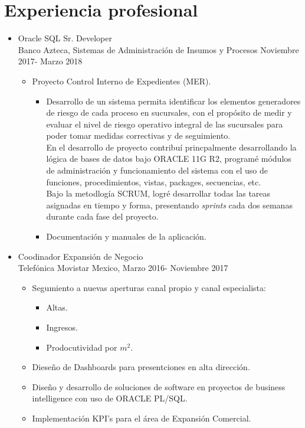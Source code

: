 \documentclass[21pt, onecolumn]{article} %
\begin{document}
\section*{ Experiencia profesional }

\begin{itemize}
 \item Oracle SQL Sr. Developer\\
  Banco Azteca, Sistemas de Administración de Insumos y Procesos {Noviembre 2017- Marzo 2018}
  \begin{itemize}
  \item Proyecto Control Interno de Expedientes (MER).
     \begin{itemize}
        \item Desarrollo de un sistema permita identificar los elementos generadores de riesgo de cada proceso en sucursales, con el propósito de medir y evaluar el nivel de riesgo operativo integral de las sucursales para poder tomar medidas correctivas y de seguimiento.
        \\En el desarrollo de proyecto contribuí princpalmente desarrollando la lógica de bases de  datos  bajo ORACLE 11G R2, programé módulos de administración y funcionamiento del sistema con el uso de  funciones, procedimientos, vistas, packages, secuencias, etc.
         \\Bajo la metodlogía SCRUM, logré desarrollar  todas las tareas asignadas en tiempo y forma, presentando \emph{sprints} cada dos semanas durante cada fase del proyecto.
        \item Documentación  y manuales de la aplicación.
     \end{itemize}
  \end{itemize}
\end{itemize}

\begin{itemize}
 \item Coodinador Expansión de Negocio\\
  Telefónica Movistar Mexico, {Marzo 2016- Noviembre 2017}
  \begin{itemize}
  \item Segumiento a nuevas aperturas  canal propio y canal especialista:
  \begin{itemize}
  \item Altas.
  \item Ingresos.
  \item Prodocutividad  por $m^2$.
  \end{itemize}
  \item Dieseño de Dashboards para presentciones en alta dirección.
  \item Diseño y desarrollo de soluciones de software en proyectos de business intelligence con uso de ORACLE PL/SQL.
  \item Implementación KPI's para el área de Expansión Comercial.
  \end{itemize}
\end{itemize}
\end{document}
